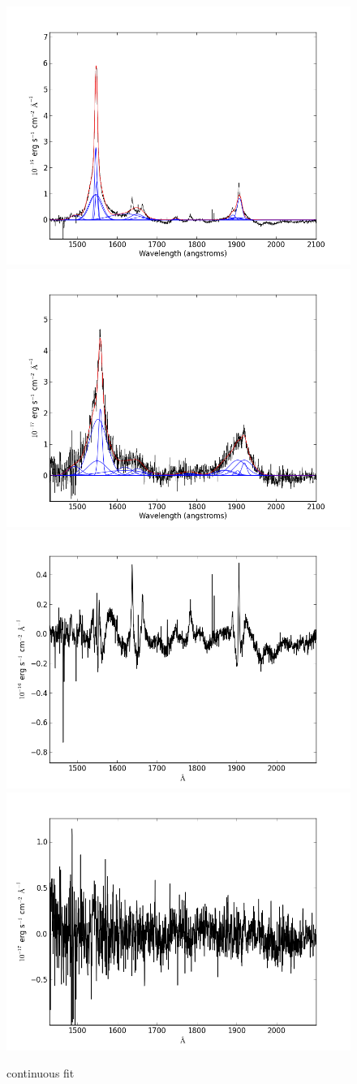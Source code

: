 \documentclass[usenatbib]{mn2e}
\begin{document}
\newpage


\begin{figure}
\begin{center}
\includegraphics[width=0.46\linewidth,angle=0]{C_10.png}
\vspace{5mm}
\includegraphics[width=0.49\linewidth,angle=0]{C_11.png}\\
\includegraphics[width=0.46\linewidth,angle=0]{C_res_10.png}
\hspace{5mm}
\includegraphics[width=0.49\linewidth,angle=0]{C_res_11.png}\\
\end{center} 
\caption{continuous fit \label{fig:landscape}}   
\end{figure}
\end{document}
